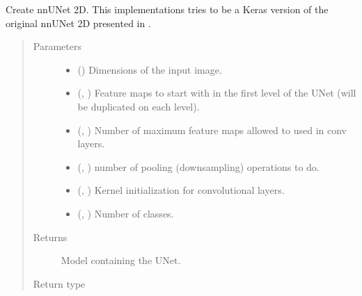 \documentclass[letterpaper,10pt,english]{sphinxmanual}
\begin{document}
\begin{fulllineitems}
\label{\detokenize{models/nnunet:sota_implementations.nnUNet_2018.nnUNet_2d.nnUNet_2D}}
Create nnU\sphinxhyphen{}Net 2D. This implementations tries to be a Keras version of the original nnU\sphinxhyphen{}Net 2D presented in
.
\begin{quote}\begin{description}
\item[{Parameters}] \leavevmode\begin{itemize}
\item {} 
 () \textendash{} Dimensions of the input image.

\item {} 
 (, ) \textendash{} Feature maps to start with in the first level of the U\sphinxhyphen{}Net (will be duplicated on each level).

\item {} 
 (, ) \textendash{} Number of maximum feature maps allowed to used in conv layers.

\item {} 
 (, ) \textendash{} number of pooling (downsampling) operations to do.

\item {} 
 (, ) \textendash{} Kernel initialization for convolutional layers.

\item {} 
 (, ) \textendash{} Number of classes.

\end{itemize}

\item[{Returns}] \leavevmode
{} \textendash{} Model containing the U\sphinxhyphen{}Net.

\item[{Return type}] \leavevmode
{}

\end{description}\end{quote}

\end{fulllineitems}
\end{document}
